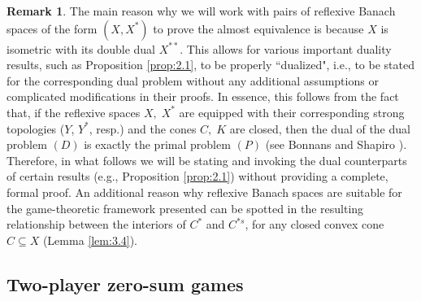 \documentclass[11pt, twoside]{article}
\numberwithin{equation}{section}
\theoremstyle{definition}
\newtheorem{remark}{Remark}[section]
\begin{document}
\begin{remark}\label{rem:reflexive}
    The main reason why we will work with pairs of reflexive Banach spaces of the form $(X,X^*)$ to prove the almost equivalence is because $X$ is isometric with its double dual $X^{**}$. This allows for various important duality results, such as Proposition \ref{prop:2.1}, to be properly ``dualized", i.e., to be stated for the corresponding dual problem without any additional assumptions or complicated modifications in their proofs. In essence, this follows from the fact that, if the reflexive spaces $X,\;X^*$ are equipped with their corresponding strong topologies ($Y$, $Y^*$, resp.) and the cones $C,\;K$ are closed, then the dual of the dual problem \hyperlink{dual}{$(D)$} is exactly the primal problem \hyperlink{primal}{$(P)$} (see Bonnans and Shapiro \cite[pp. 126--128]{bonnans2013perturbation}). Therefore, in what follows we will be stating and invoking the dual counterparts of certain results (e.g., Proposition \ref{prop:2.1}) without providing a complete, formal proof. An additional reason why reflexive Banach spaces are suitable for the game-theoretic framework presented can be spotted in the resulting relationship between the interiors of $C^*$ and $C^{*s}$, for any closed convex cone $C\subseteq X$ (Lemma \ref{lem:3.4}).   
\end{remark}


\vspace{-0.3cm}\subsection{Two-player zero-sum games}\vspace{-0.2cm}
\end{document}
